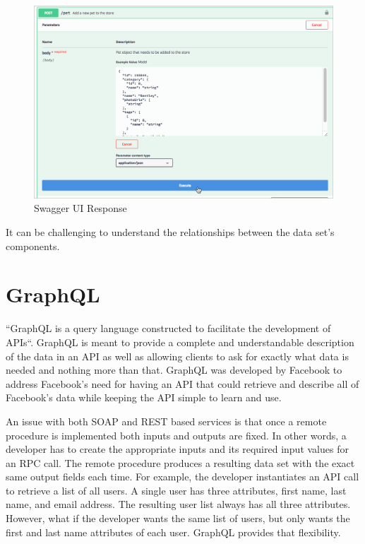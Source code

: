 \begin{figure}[!ht]
  \centering\includegraphics[width=\columnwidth]{images/swaggerui_execute.png}
  \caption{Swagger UI Response}\label{f:swagger-resp}
\end{figure}
It can be challenging to understand the relationships between the data set's 
components.

\section{GraphQL}
``GraphQL is a query language constructed to facilitate the development of APIs``\cite{hid505FacebookGraphQL2018}.
GraphQL is meant to provide a complete and understandable description of the
data in an API as well as allowing clients to ask for exactly what data is 
needed and nothing more than that\cite{hid505FacebookGraphQL2018}.  GraphQL was 
developed by Facebook to address Facebook's need for having an API that could 
retrieve and describe all of Facebook's data while keeping the API simple to 
learn and use\cite{hid505Byron2015}.

An issue with both SOAP and REST based services is that once a remote
procedure is implemented both inputs and outputs are fixed.  In other words,
a developer has to create the appropriate inputs and its required input values
for an RPC call.  The remote procedure produces a resulting data set with the
exact same output fields each time.  For example, the developer instantiates an
API call to retrieve a list of all users.  A single user has three attributes,
first name, last name, and email address.  The resulting user list always has
all three attributes.  However, what if the developer wants the same list of
users, but only wants the first and last name attributes of each user.  GraphQL
provides that flexibility.

